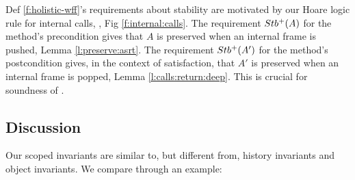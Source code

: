 {Def \ref{f:holistic-wff}'s  requirements about stability are motivated by our Hoare logic rule for internal calls,   {}, Fig \ref{f:internal:calls}. The requirement    ${Stb^+( A )}$ for the method's precondition  gives that $A$ is preserved when an internal frame is pushed, \cf Lemma \ref{l:preserve:asrt}.
The requirement     ${Stb^+( A' )}$ for the method's postcondition gives,  in the context of \strong satisfaction,  that $A'$ is preserved when an internal frame is popped, \cf Lemma \ref{l:calls:return:deep}. This is crucial for soundness of  {}.




\subsection{\textbf{Discussion}}  

  Our scoped invariants are similar to, but different from, history invariants  and object invariants.
We compare through an example:

\vspace{-.35cm}
 
}
